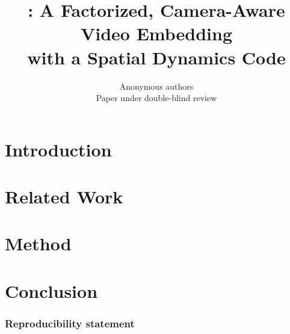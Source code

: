\documentclass{article} %
\title{\method{}: A Factorized, Camera-Aware Video Embedding\\ with a Spatial Dynamics Code}
\author{Anonymous authors\\
Paper under double-blind review}
\begin{document}
\maketitle

\begin{abstract}

\end{abstract}

\section{Introduction}
\label{sec:introduction}


\section{Related Work}
\label{sec:related-work}


\section{Method}
\label{sec:method}




\section{Conclusion}
\label{sec:conclusion}


\subsubsection*{Reproducibility statement}





\appendix

\end{document}
